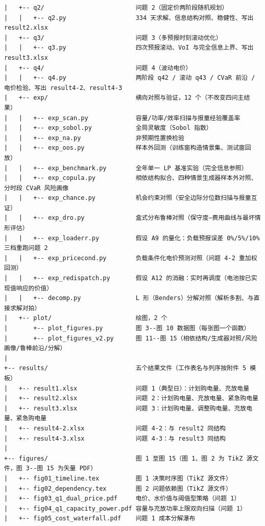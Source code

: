 \begin{lstlisting}[style=plain]
|   +-- q2/                         问题 2（固定价两阶段随机规划）
|   |   +-- q2.py                   334 天求解、信息结构对照、稳健性、写出 result2.xlsx
|   +-- q3/                         问题 3（多预报时刻滚动优化）
|   |   +-- q3.py                   四次预报滚动、VoI 与完全信息上界、写出 result3.xlsx
|   +-- q4/                         问题 4（波动电价）
|   |   +-- q4.py                   两阶段 q42 / 滚动 q43 / CVaR 前沿 / 电价检验、写出 result4-2、result4-3
|   +-- exp/                        横向对照与验证，12 个（不改变四问主结果）
|   |   +-- exp_scan.py             容量/功率/效率扫描与报童经验覆盖率
|   |   +-- exp_sobol.py            全局灵敏度（Sobol 指数）
|   |   +-- exp_na.py               非预期性置换检验
|   |   +-- exp_oos.py              样本外回测（训练窗构造情景集、测试窗回放）
|   |   +-- exp_benchmark.py        全年单一 LP 基准实验（完全信息参照）
|   |   +-- exp_copula.py           相依结构拟合、四种情景生成器样本外对照、分时段 CVaR 风险画像
|   |   +-- exp_chance.py           机会约束对照（安全边际分位数扫描与报童互证）
|   |   +-- exp_dro.py              盒式分布鲁棒对照（保守度—费用曲线与最坏情形评估）
|   |   +-- exp_loaderr.py          假设 A9 的量化：负载预报误差 0%/5%/10% 三档重跑问题 2
|   |   +-- exp_pricecond.py        负载条件化电价预测对照（问题 4-2 重加权回测）
|   |   +-- exp_redispatch.py       假设 A12 的消融：实时再调度（电池按已实现值响应的价值）
|   |   +-- decomp.py               L 形（Benders）分解对照（解析多割、与直接求解对拍）
|   +-- plot/                       绘图，2 个
|       +-- plot_figures.py         图 3--图 10 数据图（每张图一个函数）
|       +-- plot_figures_v2.py      图 11--图 15（相依结构/生成器对照/风险画像/鲁棒前沿/分解）
|
+-- results/                        五个结果文件（工作表名与列序按附件 5 模板）
|   +-- result1.xlsx                问题 1（典型日）：计划购电量、充放电量
|   +-- result2.xlsx                问题 2：计划购电量、充放电量、紧急购电量
|   +-- result3.xlsx                问题 3：计划购电量、调整购电量、充放电量、紧急购电量
|   +-- result4-2.xlsx              问题 4-2：与 result2 同结构
|   +-- result4-3.xlsx              问题 4-3：与 result3 同结构
|
+-- figures/                        图 1 至图 15（图 1、图 2 为 TikZ 源文件，图 3--图 15 为矢量 PDF）
|   +-- fig01_timeline.tex          图 1 决策时序图（TikZ 源文件）
|   +-- fig02_dependency.tex        图 2 问题依赖图（TikZ 源文件）
|   +-- fig03_q1_dual_price.pdf     电价、水价值与阈值型策略（问题 1）
|   +-- fig04_q1_capacity_power.pdf 容量与充放功率上限双向扫描（问题 1）
|   +-- fig05_cost_waterfall.pdf    问题 1 成本分解瀑布

\end{lstlisting}
